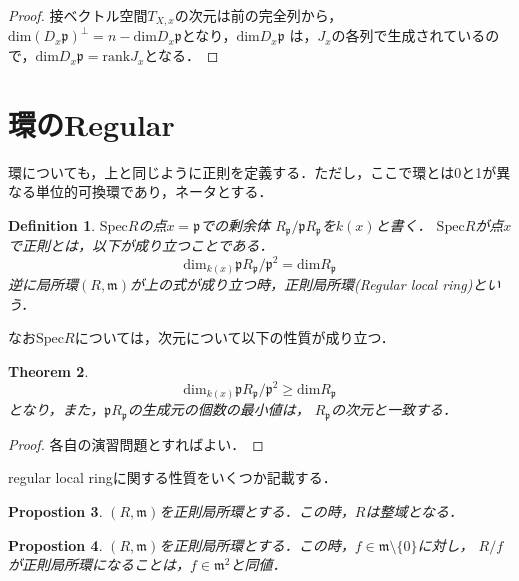 \documentclass{ujarticle}
\newtheorem{thm}{Theorem}[section]
\newtheorem{dfn}[thm]{Definition}
\newtheorem{prop}[thm]{Propostion}
\begin{document}
\begin{proof}
  接ベクトル空間$T_{X,x}$の次元は前の完全列から，
  $\mathrm{dim}(D_x \mathfrak{p})^{\bot}=n -
  \mathrm{dim}D_x \mathfrak{p}$となり，$\mathrm{dim}D_x \mathfrak{p}$
  は，$J_x$の各列で生成されているので，$\mathrm{dim}D_x \mathfrak{p}=\mathrm{rank} J_x$となる．
\end{proof}

\section{環のRegular}
\label{環のRegular}

環についても，上と同じように正則を定義する．ただし，ここで環とは0と1が異なる単位的可換環であり，ネータとする．
\begin{dfn}
 $\mathrm{Spec}R$の点$x=\mathfrak{p}$での剰余体
 $R_{\mathfrak{p}}/\mathfrak{p}R_{\mathfrak{p}}$を$k(x)$と書く．
 $\mathrm{Spec}R$が点$x$で正則とは，以下が成り立つことである．
\begin{equation*}
  \mathrm{dim}_{k(x)}\mathfrak{p}R_{\mathfrak{p}}/\mathfrak{p}^2
  = \mathrm{dim}R_{\mathfrak{p}}
\end{equation*}
逆に局所環$(R,\mathfrak{m})$が上の式が成り立つ時，正則局所環(Regular local ring)という．
\end{dfn}

なお$\mathrm{Spec}R$については，次元について以下の性質が成り立つ．
\begin{thm}
  \begin{equation*}
    \mathrm{dim}_{k(x)}\mathfrak{p}R_{\mathfrak{p}}/\mathfrak{p}^2
    \geq \mathrm{dim}R_{\mathfrak{p}}
  \end{equation*}
  となり，また，$\mathfrak{p}R_{\mathfrak{p}}$の生成元の個数の最小値は，
  $R_{\mathfrak{p}}$の次元と一致する．
\end{thm}
\begin{proof}
 各自の演習問題とすればよい．
\end{proof}

regular local ringに関する性質をいくつか記載する．
\begin{prop}
$(R,\mathfrak{m})$を正則局所環とする．この時，$R$は整域となる．
\end{prop}

\begin{prop}
$(R,\mathfrak{m})$を正則局所環とする．この時，$f \in \mathfrak{m}\setminus \{0\}$に対し，
$R/f$が正則局所環になることは，$f \in \mathfrak{m}^2$と同値．
\end{prop}
\end{document}
